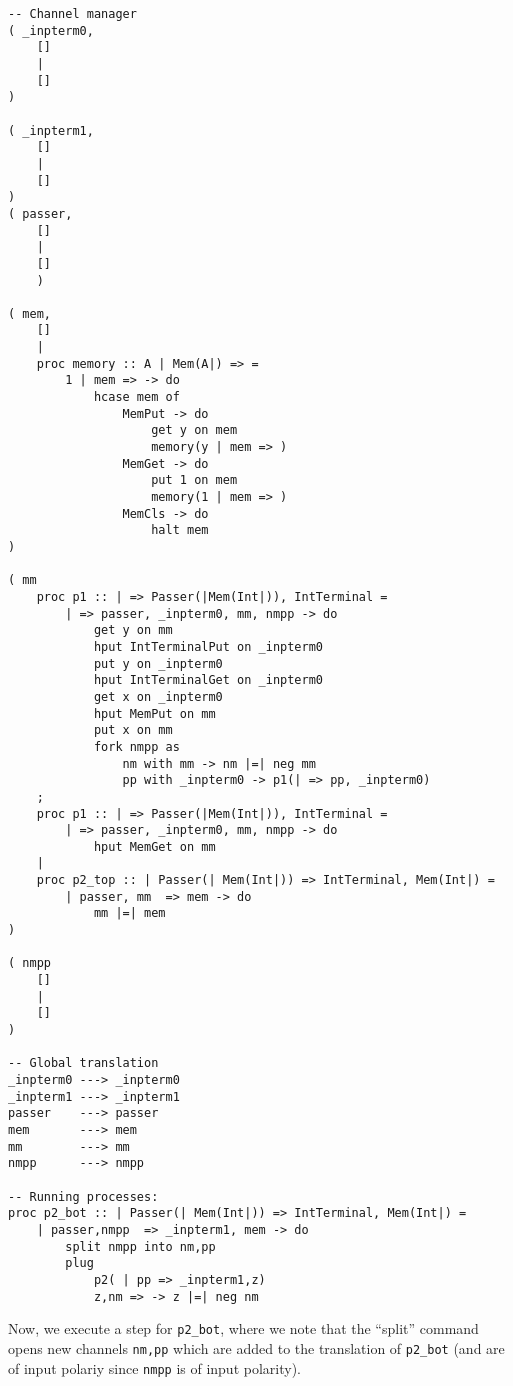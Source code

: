 \documentclass{article}
\theoremstyle{plain}%
\theoremstyle{definition}
\theoremstyle{remark}
\begin{document}
\begin{verbatim}
-- Channel manager
( _inpterm0,  
    []
    |
    []
)

( _inpterm1,  
    []
    |
    []
)
( passer,
    []
    |
    []
    )

( mem,
    []
    |
    proc memory :: A | Mem(A|) => =
        1 | mem => -> do
            hcase mem of
                MemPut -> do
                    get y on mem
                    memory(y | mem => )
                MemGet -> do
                    put 1 on mem
                    memory(1 | mem => )
                MemCls -> do
                    halt mem
)

( mm
    proc p1 :: | => Passer(|Mem(Int|)), IntTerminal = 
        | => passer, _inpterm0, mm, nmpp -> do
            get y on mm
            hput IntTerminalPut on _inpterm0
            put y on _inpterm0
            hput IntTerminalGet on _inpterm0
            get x on _inpterm0
            hput MemPut on mm
            put x on mm
            fork nmpp as
                nm with mm -> nm |=| neg mm
                pp with _inpterm0 -> p1(| => pp, _inpterm0)
    ;
    proc p1 :: | => Passer(|Mem(Int|)), IntTerminal = 
        | => passer, _inpterm0, mm, nmpp -> do
            hput MemGet on mm 
    |
    proc p2_top :: | Passer(| Mem(Int|)) => IntTerminal, Mem(Int|) =
        | passer, mm  => mem -> do
            mm |=| mem
)

( nmpp
    []
    |
    []
)

-- Global translation
_inpterm0 ---> _inpterm0 
_inpterm1 ---> _inpterm1 
passer    ---> passer 
mem       ---> mem
mm        ---> mm
nmpp      ---> nmpp

-- Running processes:
proc p2_bot :: | Passer(| Mem(Int|)) => IntTerminal, Mem(Int|) =
    | passer,nmpp  => _inpterm1, mem -> do
        split nmpp into nm,pp
        plug
            p2( | pp => _inpterm1,z)
            z,nm => -> z |=| neg nm
\end{verbatim}
Now, we execute a step for \verb|p2_bot|, where we note that the
    ``split'' command opens new channels \verb|nm,pp| which are added to
    the translation of \verb|p2_bot| (and are of input polariy since \verb|nmpp| is of input polarity).
\end{document}
